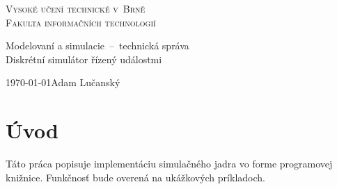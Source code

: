 \documentclass[11pt, a4paper, titlepage]{article}
\begin{document}
\begin{titlepage}

\begin{center}
{\Huge\textsc{Vysoké učení technické v~Brně}}\\
\medskip
{\huge\textsc{Fakulta informačních technologií}}\\

\LARGE{Modelovaní a simulacie\, -- \,technická správa} \\
\Huge{Diskrétní simulátor řízený událostmi} %

\end{center}

{\Large \today \hfill Adam Lučanský }
\end{titlepage}
\newpage

\section{Úvod}

Táto práca popisuje implementáciu simulačného jadra vo forme programovej knižnice. Funkčnosť bude overená na ukážkových príkladoch.
%
%
%
\end{document}

